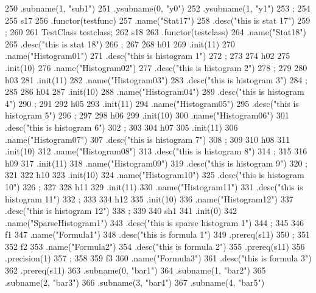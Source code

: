 \begin{DoxyCode}
{250         .subname(1, "sub1")
251         .ysubname(0, "y0")
252         .ysubname(1, "y1")
253         ;
254 
255     s17
256         .functor(testfunc)
257         .name("Stat17")
258         .desc("this is stat 17")
259         ;
260 
261     TestClass testclass;
262     s18
263         .functor(testclass)
264         .name("Stat18")
265         .desc("this is stat 18")
266         ;
267 
268     h01
269         .init(11)
270         .name("Histogram01")
271         .desc("this is histogram 1")
272         ;
273 
274     h02
275         .init(10)
276         .name("Histogram02")
277         .desc("this is histogram 2")
278         ;
279 
280     h03
281         .init(11)
282         .name("Histogram03")
283         .desc("this is histogram 3")
284         ;
285 
286     h04
287         .init(10)
288         .name("Histogram04")
289         .desc("this is histogram 4")
290         ;
291 
292     h05
293         .init(11)
294         .name("Histogram05")
295         .desc("this is histogram 5")
296         ;
297 
298     h06
299         .init(10)
300         .name("Histogram06")
301         .desc("this is histogram 6")
302         ;
303 
304     h07
305         .init(11)
306         .name("Histogram07")
307         .desc("this is histogram 7")
308         ;
309 
310     h08
311         .init(10)
312         .name("Histogram08")
313         .desc("this is histogram 8")
314         ;
315 
316     h09
317         .init(11)
318         .name("Histogram09")
319         .desc("this is histogram 9")
320         ;
321 
322     h10
323         .init(10)
324         .name("Histogram10")
325         .desc("this is histogram 10")
326         ;
327 
328     h11
329         .init(11)
330         .name("Histogram11")
331         .desc("this is histogram 11")
332         ;
333 
334     h12
335         .init(10)
336         .name("Histogram12")
337         .desc("this is histogram 12")
338         ;
339 
340     sh1
341         .init(0)
342         .name("SparseHistogram1")
343         .desc("this is sparse histogram 1")
344         ;
345 
346     f1
347         .name("Formula1")
348         .desc("this is formula 1")
349         .prereq(s11)
350         ;
351 
352     f2
353         .name("Formula2")
354         .desc("this is formula 2")
355         .prereq(s11)
356         .precision(1)
357         ;
358 
359     f3
360         .name("Formula3")
361         .desc("this is formula 3")
362         .prereq(s11)
363         .subname(0, "bar1")
364         .subname(1, "bar2")
365         .subname(2, "bar3")
366         .subname(3, "bar4")
367         .subname(4, "bar5")
}
\end{DoxyCode}
